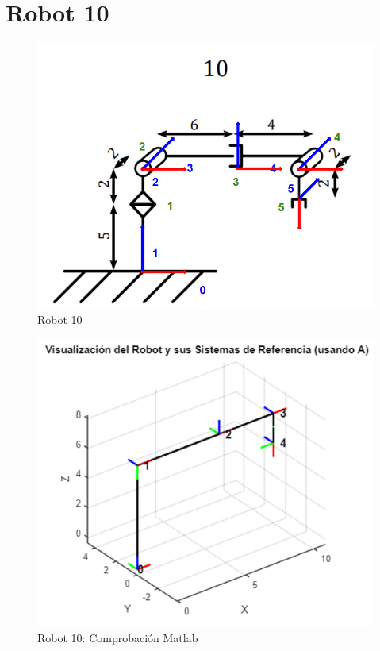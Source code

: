\section{Robot 10}

\begin{figure}
	\centering
	\includegraphics[width=0.5\linewidth]{img/Robot10_1}
	\caption{Robot 10}
	\label{fig:robot10_1}
\end{figure}


\begin{figure}
	\centering
	\includegraphics[width=0.7\linewidth]{img/Robot10}
	\caption{Robot 10: Comprobación Matlab}
	\label{fig:robot10}
\end{figure}
